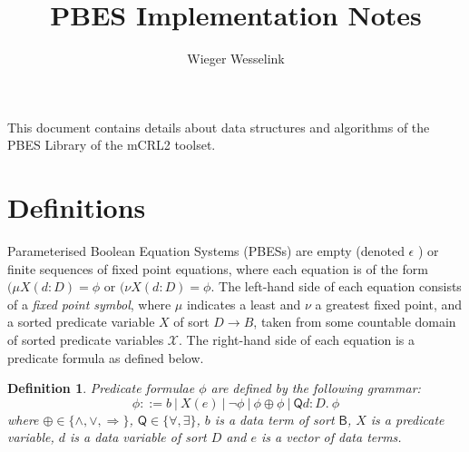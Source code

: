 \documentclass{article}
\newtheorem{definition}[theorem]{Definition}
\begin{document}
\title{PBES Implementation Notes}
\author{Wieger Wesselink}
\maketitle

This document contains details about data structures and algorithms of the
PBES Library of the mCRL2 toolset.

\section{Definitions}

Parameterised Boolean Equation Systems (PBESs) are empty (denoted $\epsilon $%
) or finite sequences of fixed point equations, where each equation is of
the form $(\mu X(d{:}D)=\phi $ or $(\nu X(d{:}D)=\phi $. The left-hand side
of each equation consists of a \emph{fixed point symbol}, where $\mu $
indicates a least and $\nu $ a greatest fixed point, and a sorted predicate
variable $X$ of sort $D\rightarrow B$, taken from some countable domain of
sorted predicate variables $\mathcal{X}$. The right-hand side of each
equation is a predicate formula as defined below.

\begin{definition}
\emph{Predicate formulae} $\phi $ are defined by the following grammar: 
\begin{equation*}
\phi ::=b~|~X(e)~|~\lnot \phi ~|~\phi \oplus \phi ~|~\mathsf{Q}d:D.~\phi
\end{equation*}%
where $\oplus \in \{\wedge ,\vee ,\Rightarrow \}$, $\mathsf{Q}\in \{\forall
,\exists \}$, $b$ is a data term of sort $\mathsf{B}$, $X$ is a predicate
variable, $d$ is a data variable of sort $D$ and $e$ is a vector of data
terms.
\end{definition}
\end{document}
